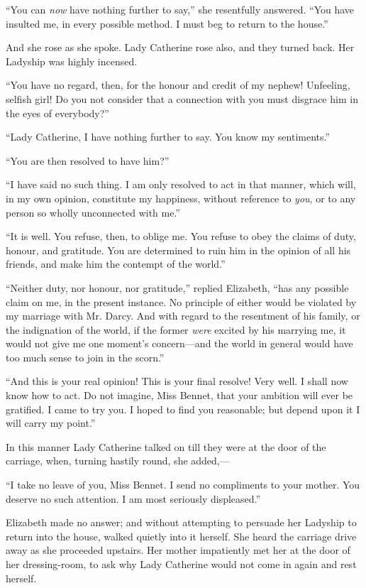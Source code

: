 \documentclass[12pt,openright]{book}
\begin{document}
“You can \textit{now} have nothing further to say,” she resentfully answered. “You have insulted me, in every possible method. I must beg to return to the house.”

And she rose as she spoke. Lady Catherine rose also, and they turned back. Her Ladyship was highly incensed.

“You have no regard, then, for the honour and credit of my nephew! Unfeeling, selfish girl! Do you not consider that a connection with you must disgrace him in the eyes of everybody?”

“Lady Catherine, I have nothing further to say. You know my sentiments.”

“You are then resolved to have him?”

“I have said no such thing. I am only resolved to act in that manner, which will, in my own opinion, constitute my happiness, without reference to \textit{you}, or to any person so wholly unconnected with me.”

“It is well. You refuse, then, to oblige me. You refuse to obey the claims of duty, honour, and gratitude. You are determined to ruin him in the opinion of all his friends, and make him the contempt of the world.”

“Neither duty, nor honour, nor gratitude,” replied Elizabeth, “has any possible claim on me, in the present instance. No principle of either would be violated by my marriage with Mr. Darcy. And with regard to the resentment of his family, or the indignation of the world, if the former \textit{were} excited by his marrying me, it would not give me one moment’s concern—and the world in general would have too much sense to join in the scorn.”

“And this is your real opinion! This is your final resolve! Very well. I shall now know how to act. Do not imagine, Miss Bennet, that your ambition will ever be gratified. I came to try you. I hoped to find you reasonable; but depend upon it I will carry my point.”

In this manner Lady Catherine talked on till they were at the door of the carriage, when, turning hastily round, she added,—

“I take no leave of you, Miss Bennet. I send no compliments to your mother. You deserve no such attention. I am most seriously displeased.”

Elizabeth made no answer; and without attempting to persuade her Ladyship to return into the house, walked quietly into it herself. She heard the carriage drive away as she proceeded upstairs. Her mother impatiently met her at the door of her dressing-room, to ask why Lady Catherine would not come in again and rest herself.
\end{document}
